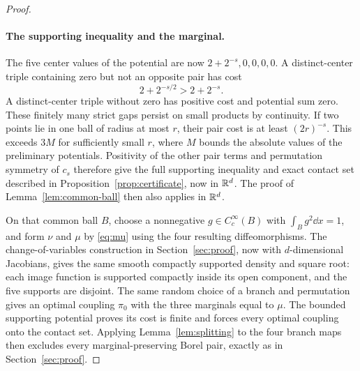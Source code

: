 \begin{proof}
\paragraph{The supporting inequality and the marginal.}
The five center values of the potential are now
\(2+2^{-s},0,0,0,0\). A distinct-center triple containing zero but
not an opposite pair has cost
\[
 2+2^{-s/2}>2+2^{-s}.
\]
A distinct-center triple without zero has positive cost and potential
sum zero. These finitely many strict gaps persist on small products
by continuity. If two points lie in one ball of radius at most \(r\),
their pair cost is at least \((2r)^{-s}\). This exceeds \(3M\) for
sufficiently small \(r\), where \(M\) bounds the absolute values of
the preliminary potentials. Positivity of the other pair terms and
permutation symmetry of \(c_s\) therefore give the full supporting
inequality and exact contact set described in
Proposition~\ref{prop:certificate}, now in \(\mathbb R^d\).
The proof of Lemma~\ref{lem:common-ball} then also applies in \(\mathbb R^d\).

On that common ball \(B\), choose a nonnegative
\(g\in C_c^\infty(B)\) with \(\int_B g^2\dd x=1\), and form \(\nu\) and
\(\mu\) by \eqref{eq:mu} using the four resulting diffeomorphisms.
The change-of-variables construction in Section~\ref{sec:proof},
now with \(d\)-dimensional Jacobians, gives the same smooth compactly
supported density and square root: each image function is supported
compactly inside its open component, and the five supports are
disjoint. The same random choice of a branch and permutation gives
an optimal coupling \(\pi_0\) with the three marginals equal to
\(\mu\). The bounded supporting potential proves its cost is finite
and forces every optimal coupling onto the contact set. Applying
Lemma~\ref{lem:splitting} to the four branch maps then excludes
every marginal-preserving Borel pair, exactly as in
Section~\ref{sec:proof}.


\end{proof}
